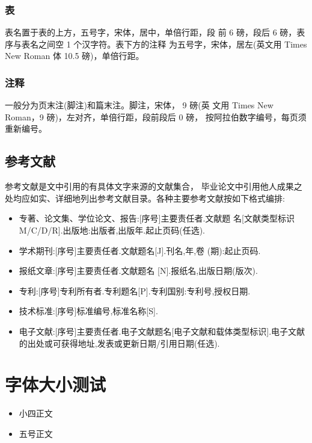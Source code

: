 \documentclass{LZU}
\begin{document}
\subsubsection{表}
表名置于表的上方，五号字，宋体，居中，单倍行距，段 前 6 磅，段后 6 磅，表序与表名之间空 1 个汉字符。表下方的注释 为五号字，宋体，居左(英文用 Times New Roman 体 10.5 磅)，单倍行距。
\subsubsection{注释}
一般分为页末注(脚注)和篇末注。脚注，宋体， 9 磅(英 文用 Times New Roman，9 磅)，左对齐，单倍行距，段前段后 0 磅， 按阿拉伯数字编号，每页须重新编号。
\subsection{参考文献}
\label{subsec:reference}
参考文献是文中引用的有具体文字来源的文献集合， 毕业论文中引用他人成果之处均应如实、详细地列出参考文献目录。各种主要参考文献按如下格式编排:
\begin{itemize}
    \item 专著、论文集、学位论文、报告:[序号]主要责任者.文献题 名[文献类型标识M/C/D/R].出版地:出版者,出版年.起止页码(任选).
    \item 学术期刊:[序号]主要责任者.文献题名[J].刊名,年,卷 (期):起止页码.
    \item 报纸文章:[序号]主要责任者.文献题名 [N].报纸名,出版日期(版次).
    \item 专利:[序号]专利所有者.专利题名[P].专利国别:专利号,授权日期.
    \item 技术标准:[序号]标准编号,标准名称[S].
    \item 电子文献:[序号]主要责任者.电子文献题名[电子文献和载体类型标识].电子文献的出处或可获得地址,发表或更新日期/引用日期(任选).
\end{itemize}
\section{字体大小测试}
\begin{itemize}
    \item {小四}正文
    \item {五号}正文
\end{itemize}

\printbibliography[title={参考文献},heading=bibintoc]
\Appendix
\end{document}
